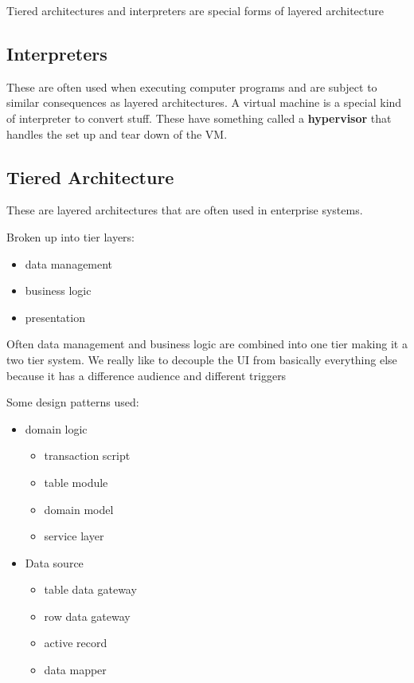 \documentclass{article}
\begin{document}
Tiered architectures and interpreters are special forms of layered architecture

\subsection*{Interpreters} %
\label{sub:interpreters}
These are often used when executing computer programs and are subject to similar consequences as layered architectures. A virtual machine is a special kind of interpreter to convert stuff. These have something called a \textbf{hypervisor} that handles the set up and tear down of the VM.

\subsection*{Tiered Architecture} %
\label{sub:tiered_architecture}
These are layered architectures that are often used in enterprise systems.

Broken up into tier layers:
\begin{itemize}
    \item data management
    \item business logic
    \item presentation
\end{itemize}

Often data management and business logic are combined into one tier making it a two tier system. We really like to decouple the UI from basically everything else because it has a difference audience and different triggers

Some design patterns used:
\begin{itemize}
    \item domain logic
    \begin{itemize}
        \item transaction script
        \item table module
        \item domain model
        \item service layer
    \end{itemize}
    \item Data source
    \begin{itemize}
        \item table data gateway
        \item row data gateway
        \item active record
        \item data mapper
    \end{itemize}
\end{itemize}
\end{document}
